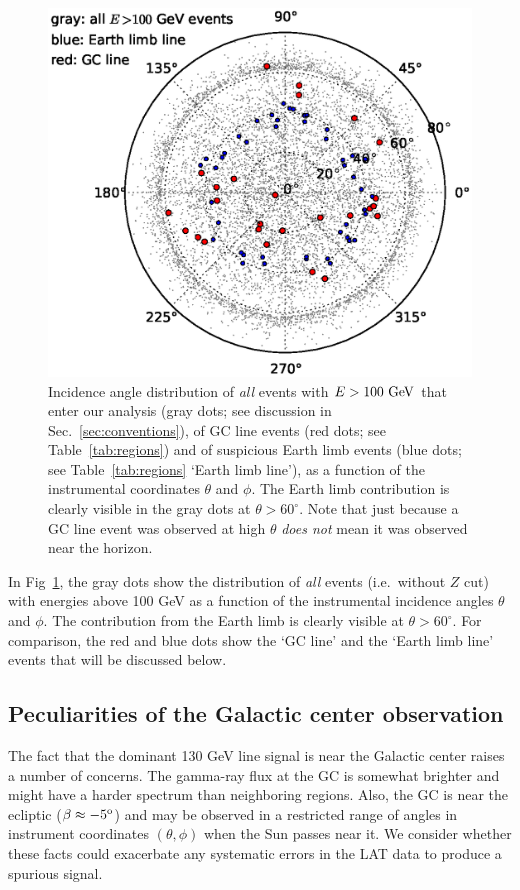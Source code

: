 \documentclass[aps,twocolumn,prd,superscriptaddress,showpacs,nofootinbib,fixfloat]{revtex4}
\newcommand{\GeV}{{\rm ~GeV}}
\newcommand{\degree}{^{\rm o}}
\begin{document}
\begin{figure}[h]
  \begin{center}
    \includegraphics[width=0.9\linewidth]{plots/polarCounts.eps}
    \vspace{-0.5cm}
  \end{center}
  \caption{Incidence angle distribution of \emph{all} events
  with $E>100\GeV$ that enter our analysis (gray dots; see
  discussion in Sec.~\ref{sec:conventions}), of GC line
  events (red dots; see Table~\ref{tab:regions}) and of
  suspicious Earth limb events (blue dots; see
  Table~\ref{tab:regions} `Earth limb line'), as a function of
  the instrumental coordinates $\theta$ and $\phi$. The
  Earth limb contribution is clearly visible in the gray
  dots at $\theta > 60^\circ$.  Note that just because a GC line event was
  observed at high $\theta$ \emph{does not} mean it was observed near the
  horizon.}
  \label{fig:phiThetaDist}
\end{figure}

In
Fig~\ref{fig:phiThetaDist}, the gray dots show the
distribution of \emph{all} events (i.e.~without $Z$ cut)
with energies above 100 GeV as a function of the instrumental
incidence angles $\theta$ and $\phi$.
The contribution from the Earth limb is clearly visible at
$\theta>60^\circ$. For comparison, the red and blue dots
show the `GC line' and the `Earth limb line' events that
will be discussed below.

\subsection{Peculiarities of the Galactic center observation}
The fact that the dominant 130 GeV line signal is near the
Galactic center raises a number of concerns.  The gamma-ray
flux at the GC is somewhat brighter and might have a harder
spectrum than neighboring regions. Also, the GC is near the
ecliptic ($\beta \approx -5\degree$) and may be observed in
a restricted range of angles in instrument coordinates
$(\theta, \phi)$ when the Sun passes near it.  We consider
whether these facts could exacerbate any systematic errors
in the LAT data to produce a spurious signal.
\end{document}
